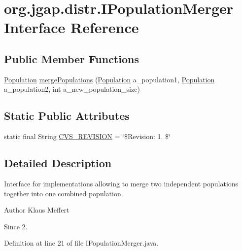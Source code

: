 \hypertarget{interfaceorg_1_1jgap_1_1distr_1_1_i_population_merger}{\section{org.\-jgap.\-distr.\-I\-Population\-Merger Interface Reference}
\label{interfaceorg_1_1jgap_1_1distr_1_1_i_population_merger}
}
\subsection*{Public Member Functions}
\begin{DoxyCompactItemize}
\item 
\hyperlink{classorg_1_1jgap_1_1_population}{Population} \hyperlink{interfaceorg_1_1jgap_1_1distr_1_1_i_population_merger_aa030287137147ffcca3aa089828ff355}{merge\-Populations} (\hyperlink{classorg_1_1jgap_1_1_population}{Population} a\-\_\-population1, \hyperlink{classorg_1_1jgap_1_1_population}{Population} a\-\_\-population2, int a\-\_\-new\-\_\-population\-\_\-size)
\end{DoxyCompactItemize}
\subsection*{Static Public Attributes}
\begin{DoxyCompactItemize}
\item 
static final String \hyperlink{interfaceorg_1_1jgap_1_1distr_1_1_i_population_merger_ac43347a4519095404ac847075c6b1702}{C\-V\-S\-\_\-\-R\-E\-V\-I\-S\-I\-O\-N} = \char`\"{}\$Revision\-: 1. \$\char`\"{}
\end{DoxyCompactItemize}


\subsection{Detailed Description}
Interface for implementations allowing to merge two independent populations together into one combined population.

\begin{DoxyAuthor}{Author}
Klaus Meffert 
\end{DoxyAuthor}
\begin{DoxySince}{Since}
2. 
\end{DoxySince}


Definition at line 21 of file I\-Population\-Merger.\-java.



